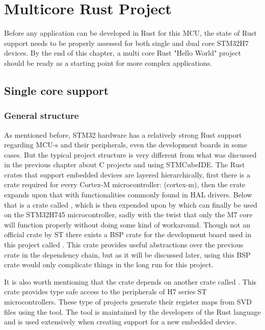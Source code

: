 \chapter{Multicore Rust Project}

Before any application can be developed in Rust for this MCU, the state of Rust support needs to be properly assessed for both single and dual core STM32H7 devices. By the end of this chapter, a multi core Rust "Hello World" project should be ready as a starting point for more complex applications.

\section{Single core support}

\subsection{General structure}

As mentioned before, STM32 hardware has a relatively strong Rust support regarding MCU-s and their peripherals, even the development boards in some cases. But the typical project structure is very different from what was discussed in the previous chapter about C projects and using STMCubeIDE. The Rust crates that support embedded devices are layered hierarchically, first there is a crate required for every Cortex-M microcontroller: \mycode(cortex-m), then the  crate expands upon that with functionalities commonly found in HAL drivers. Below that is a crate called , which is then expended upon by  which can finally be used on the STM32H745 microcontroller, sadly with the twist that only the M7 core will function properly without doing some kind of workaround. Though not an official crate by ST there exists a BSP crate for the development board used in this project called . This crate provides useful abstractions over the previous crate in the dependency chain, but as it will be discussed later, using this BSP crate would only complicate things in the long run for this project.

It is also worth mentioning that the  crate depends on another crate called . This crate provides type safe access to the peripherals of H7 series ST microcontrollers. These type of projects generate their register maps from SVD files using the  tool. The tool is maintained by the developers of the Rust language and is used extensively when creating support for a new embedded device.

